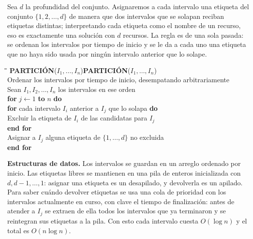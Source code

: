 \documentclass[12pt, spanish, oneside, openany]{book}
\newcommand{\pl}[1]{\makebox[1.6em][r]{\texttt{\footnotesize #1}}\hspace{0.9em}}
\newenvironment{pseudo}[1]{%
  \begin{center}%
  \begin{mdframed}[style=pseudobox]%
  \small
  \begin{tabbing}%
  \hspace{2.5em}\=\hspace{1.5em}\=\hspace{1.5em}\=\hspace{1.5em}\=\hspace{1.5em}\=\kill
  \def\pseudotitulo{#1}\ifx\pseudotitulo\empty\else#1\\[3pt]\fi}%
  {\end{tabbing}\end{mdframed}\end{center}}
\newenvironment{estructuras}%
  {\begin{center}\begin{minipage}{0.93\textwidth}\begin{mdframed}[style=estrbox]%
   \small\textbf{Estructuras de datos.}\;}%
  {\end{mdframed}\end{minipage}\end{center}}
\theoremstyle{uprightplain}
\theoremstyle{definition}
\theoremstyle{remark}
\theoremstyle{definition}
\begin{document}
Sea $d$ la profundidad del conjunto. Asignaremos a cada intervalo una etiqueta del conjunto $\{1,2,\dots,d\}$ de manera que dos intervalos que se solapan reciban etiquetas distintas; interpretando cada etiqueta como el nombre de un recurso, eso es exactamente una solución con $d$ recursos. La regla es de una sola pasada: se ordenan los intervalos por tiempo de inicio y se le da a cada uno una etiqueta que no haya sido usada por ningún intervalo anterior que lo solape.

\begin{pseudo}{\textbf{PARTICIÓN}($I_1,\dots,I_n$)}
\pl{1}\> Ordenar los intervalos por tiempo de inicio, desempatando arbitrariamente\\
\pl{2}\> Sean $I_1,I_2,\dots,I_n$ los intervalos en ese orden\\
\pl{3}\> \textbf{for} $j \leftarrow 1$ \textbf{to} $n$ \textbf{do}\\
\pl{4}\>\> \textbf{for} cada intervalo $I_i$ anterior a $I_j$ que lo solapa \textbf{do}\\
\pl{5}\>\>\> Excluir la etiqueta de $I_i$ de las candidatas para $I_j$\\
\pl{6}\>\> \textbf{end for}\\
\pl{7}\>\> Asignar a $I_j$ alguna etiqueta de $\{1,\dots,d\}$ no excluida\\
\pl{8}\> \textbf{end for}
\end{pseudo}

\begin{estructuras}
Los intervalos se guardan en un arreglo ordenado por inicio. Las etiquetas
libres se mantienen en una pila de enteros inicializada con
$d,d-1,\dots,1$: asignar una etiqueta es un desapilado, y devolverla es un
apilado. Para saber cuándo devolver etiquetas se usa una cola de prioridad con
los intervalos actualmente en curso, con clave el tiempo de finalización: antes
de atender a $I_j$ se extraen de ella todos los intervalos que ya terminaron y
se reintegran sus etiquetas a la pila. Con esto cada intervalo cuesta
$O(\log n)$ y el total es $O(n\log n)$.
\end{estructuras}
\end{document}
